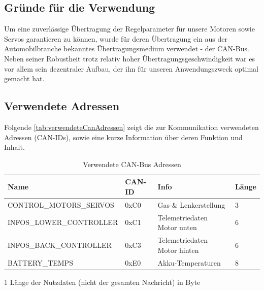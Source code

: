 \subsection{Gründe für die Verwendung}
Um eine zuverlässige Übertragung der Regelparameter für unsere Motoren sowie Servos garantieren zu können, wurde für deren Übertragung ein aus der Automobilbranche bekanntes Übertragungsmedium verwendet - der CAN-Bus. 
Neben seiner Robustheit trotz relativ hoher Übertragungsgeschwindigkeit war es vor allem sein dezentraler Aufbau, der ihn für unseren Anwendungszweck optimal gemacht hat.

\newpage

\subsection{Verwendete Adressen}
Folgende \autoref{tab:verwendeteCanAdressen} zeigt die zur Kommunikation verwendeten Adressen (CAN-IDs), sowie eine kurze Information über deren Funktion und Inhalt.
\begin{table}[h]
    \begin{threeparttable}
        \centering
        \begin{tabular}{|l|l|l|l|}
            \hline
        Name                              & CAN-ID & Info         & Länge\tnote{1} \\\hline
        CONTROL\_MOTORS\_SERVOS  & 0xC0   & Gas-\& Lenkerstellung & 3     \\
        INFOS\_LOWER\_CONTROLLER & 0xC1   & Telemetriedaten Motor unten  & 6     \\
        INFOS\_BACK\_CONTROLLER  & 0xC3   & Telemetriedaten Motor hinten & 6     \\
        BATTERY\_TEMPS           & 0xE0   & Akku-Temperaturen            & 8    \\\hline
        \end{tabular}
        \begin{tablenotes}\footnotesize
            \item[1] Länge der Nutzdaten (nicht der gesamten Nachricht) in Byte
        \end{tablenotes}
    \end{threeparttable}
    \caption{Verwendete CAN-Bus Adressen\label{tab:verwendeteCanAdressen}}
\end{table}
